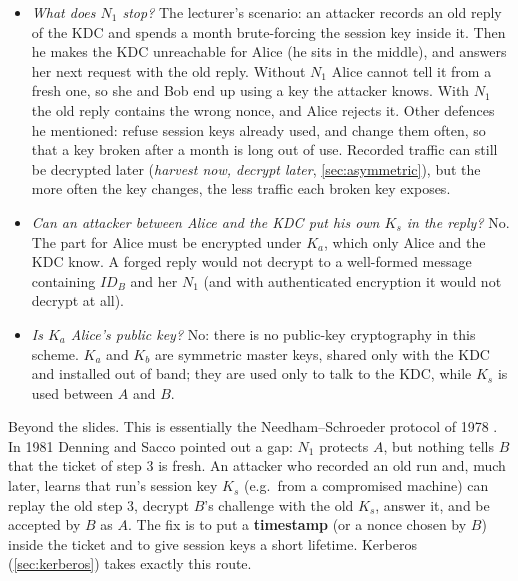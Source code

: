 \begin{remark}
\leavevmode
\begin{itemize}
    \item \emph{What does $N_1$ stop?} The lecturer's scenario: an attacker records an old reply of the KDC and spends a month brute-forcing the session key inside it. Then he makes the KDC unreachable for Alice (he sits in the middle), and answers her next request with the old reply. Without $N_1$ Alice cannot tell it from a fresh one, so she and Bob end up using a key the attacker knows. With $N_1$ the old reply contains the wrong nonce, and Alice rejects it. Other defences he mentioned: refuse session keys already used, and change them often, so that a key broken after a month is long out of use. Recorded traffic can still be decrypted later (\emph{harvest now, decrypt later}, \cref{sec:asymmetric}), but the more often the key changes, the less traffic each broken key exposes.
    \item \emph{Can an attacker between Alice and the KDC put his own $K_s$ in the reply?} No. The part for Alice must be encrypted under $K_a$, which only Alice and the KDC know. A forged reply would not decrypt to a well-formed message containing $ID_B$ and her $N_1$ (and with authenticated encryption it would not decrypt at all).
    \item \emph{Is $K_a$ Alice's public key?} No: there is no public-key cryptography in this scheme. $K_a$ and $K_b$ are symmetric master keys, shared only with the KDC and installed out of band; they are used only to talk to the KDC, while $K_s$ is used between $A$ and $B$.
\end{itemize}
\end{remark}

\begin{remark}
Beyond the slides. This is essentially the Needham--Schroeder protocol of 1978 \cite{needham1978}. In 1981 Denning and Sacco \cite{denning1981} pointed out a gap: $N_1$ protects $A$, but nothing tells $B$ that the ticket of step 3 is fresh. An attacker who recorded an old run and, much later, learns that run's session key $K_s$ (e.g.\ from a compromised machine) can replay the old step 3, decrypt $B$'s challenge with the old $K_s$, answer it, and be accepted by $B$ as $A$. The fix is to put a \textbf{timestamp} (or a nonce chosen by $B$) inside the ticket and to give session keys a short lifetime. Kerberos (\cref{sec:kerberos}) takes exactly this route.
\end{remark}

